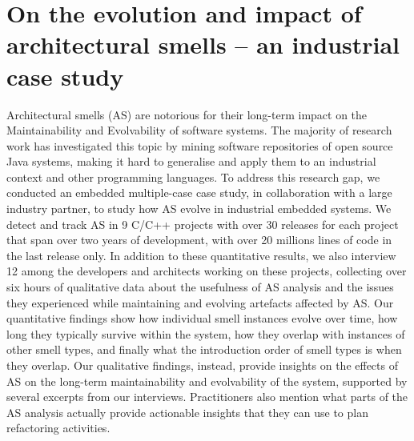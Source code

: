 \setlength{\headheight}{1.2cm}
\renewcommand{\publ}{\flushleft\footnotesize{Based on:\\[0.1cm]
		\textit{D. Sas, P. Avgeriou, and U. Uyumaz. "On the evolution and impact of architectural smells—an industrial case study." Empirical Software Engineering 27.4 (2022): 1-45.} \\[0.1cm]
}}

\chapter{On the evolution and impact of architectural smells -- an industrial case study}
\label{chap:4}

\begin{Abstract}
	Architectural smells (AS) are notorious for their  long-term impact on the Maintainability and Evolvability of software systems.
	The majority of research work has investigated this topic by mining software repositories of open source Java systems, making it hard to generalise and apply them to an industrial context and other programming languages.
	To address this research gap, we conducted an embedded multiple-case case study, in collaboration with a large industry partner, to study how AS evolve in industrial embedded systems.
	We detect and track AS in 9 C/C++ projects with over 30 releases for each project that span over two years of development, with over 20 millions lines of code in the last release only.
	In addition to these quantitative results, we also interview 12 among the developers and architects working on these projects, collecting over six hours of qualitative data about the usefulness of AS analysis and the issues they experienced while maintaining and evolving artefacts affected by AS.
	Our quantitative findings show how individual smell instances evolve over time, how long they typically survive within the system, how they overlap with instances of other smell types, and finally what the introduction order of smell types is when they overlap.
	Our qualitative findings, instead, provide insights on the effects of AS on the long-term maintainability and evolvability of the system, supported by several excerpts from our interviews. Practitioners also mention what parts of the AS analysis actually provide actionable insights that they can use to plan refactoring activities.
\end{Abstract}

